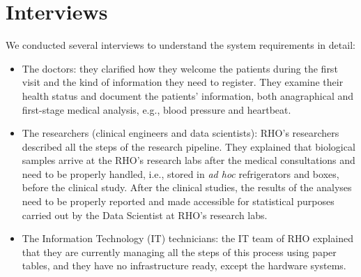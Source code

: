 \section{Interviews}
We conducted several interviews to understand the system requirements in detail:
\begin{itemize}
    \item The doctors: they clarified how they welcome the patients during the first visit and the kind of information they need to register. They examine their health status and document the patients' information, both anagraphical and first-stage medical analysis, e.g., blood pressure and heartbeat.
    \item The researchers (clinical engineers and data scientists): RHO's researchers described all the steps of the research pipeline. They explained that biological samples arrive at the RHO's research labs after the medical consultations and need to be properly handled, i.e., stored in \emph{ad hoc} refrigerators and boxes, before the clinical study. After the clinical studies, the results of the analyses need to be properly reported and made accessible for statistical purposes carried out by the Data Scientist at RHO's research labs. 
    \item The Information Technology (IT) technicians: the IT team of RHO explained that they are currently managing all the steps of this process using paper tables, and they have no infrastructure ready, except the hardware systems.
\end{itemize}